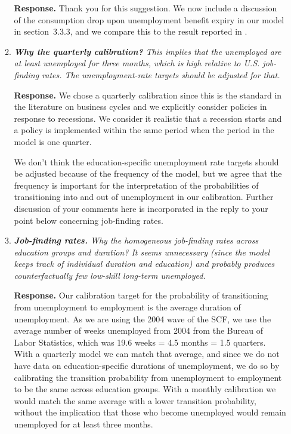 \documentclass[12pt,letterpaper,english]{article}
\begin{document}
\begin{enumerate}
\begin{enumerate}
		\noindent \textbf{Response.} Thank you for this suggestion. We now include a discussion of the consumption drop upon unemployment benefit expiry in our model in section~3.3.3, and we compare this to the result reported in \citet{ganongConsumer2019}. 
	
		\item \textit{\textbf{Why the quarterly calibration?} This implies that the unemployed are at least unemployed for three months, which is high relative to U.S. job-finding rates. The unemployment-rate targets should be adjusted for that.}

		\noindent \textbf{Response.} We chose a quarterly calibration since this is the standard in the literature on business cycles and we explicitly consider policies in response to recessions. We consider it realistic that a recession starts and a policy is implemented within the same period when the period in the model is one quarter.
		
		We don't think the education-specific unemployment rate targets should be adjusted because of the frequency of the model, but we agree that the frequency is important for the interpretation of the probabilities of transitioning into and out of unemployment in our calibration. Further discussion of your comments here is incorporated in the reply to your point below concerning job-finding rates. 
		
		\item \textit{\textbf{Job-finding rates.} Why the homogeneous job-finding rates across education groups and duration? It seems unnecessary (since the model keeps track of individual duration and education) and probably produces counterfactually few low-skill long-term unemployed.}
		
		\noindent \textbf{Response.} Our calibration target for the probability of transitioning from unemployment to employment is the average duration of unemployment. As we are using the 2004 wave of the SCF, we use the average number of weeks unemployed from 2004 from the Bureau of Labor Statistics, which was 19.6 weeks = 4.5 months = 1.5 quarters. With a quarterly model we can match that average, and since we do not have data on education-specific durations of unemployment, we do so by calibrating the transition probability from unemployment to employment to be the same across education groups. With a monthly calibration we would match the same average with a lower transition probability, without the implication that those who become unemployed would remain unemployed for at least three months. 
		

\end{enumerate}
\end{enumerate}
\end{document}
